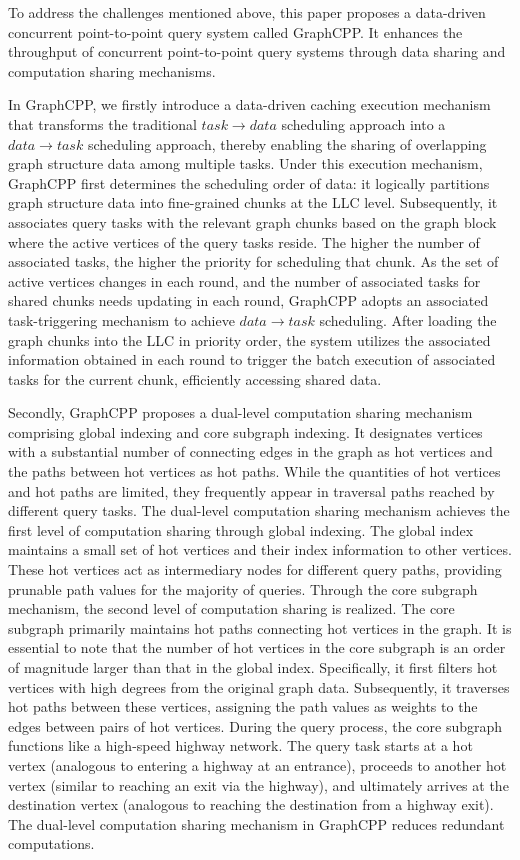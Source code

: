 \documentclass[lettersize,journal]{IEEEtran} %
\begin{document}
To address the challenges mentioned above, this paper proposes a data-driven concurrent point-to-point query system called GraphCPP. It enhances the throughput of concurrent point-to-point query systems through data sharing and computation sharing mechanisms.

In GraphCPP, we firstly introduce a data-driven caching execution mechanism that transforms the traditional $task→data$ scheduling approach into a $data→task$ scheduling approach, thereby enabling the sharing of overlapping graph structure data among multiple tasks. Under this execution mechanism, GraphCPP first determines the scheduling order of data: it logically partitions graph structure data into fine-grained chunks at the LLC level. Subsequently, it associates query tasks with the relevant graph chunks based on the graph block where the active vertices of the query tasks reside. The higher the number of associated tasks, the higher the priority for scheduling that chunk. As the set of active vertices changes in each round, and the number of associated tasks for shared chunks needs updating in each round, GraphCPP adopts an associated task-triggering mechanism to achieve $data→task$ scheduling. After loading the graph chunks into the LLC in priority order, the system utilizes the associated information obtained in each round to trigger the batch execution of associated tasks for the current chunk, efficiently accessing shared data.

Secondly, GraphCPP proposes a dual-level computation sharing mechanism comprising global indexing and core subgraph indexing. It designates vertices with a substantial number of connecting edges in the graph as hot vertices and the paths between hot vertices as hot paths. While the quantities of hot vertices and hot paths are limited, they frequently appear in traversal paths reached by different query tasks. The dual-level computation sharing mechanism achieves the first level of computation sharing through global indexing. The global index maintains a small set of hot vertices and their index information to other vertices. These hot vertices act as intermediary nodes for different query paths, providing prunable path values for the majority of queries. Through the core subgraph mechanism, the second level of computation sharing is realized. The core subgraph primarily maintains hot paths connecting hot vertices in the graph. It is essential to note that the number of hot vertices in the core subgraph is an order of magnitude larger than that in the global index. Specifically, it first filters hot vertices with high degrees from the original graph data. Subsequently, it traverses hot paths between these vertices, assigning the path values as weights to the edges between pairs of hot vertices. During the query process, the core subgraph functions like a high-speed highway network. The query task starts at a hot vertex (analogous to entering a highway at an entrance), proceeds to another hot vertex (similar to reaching an exit via the highway), and ultimately arrives at the destination vertex (analogous to reaching the destination from a highway exit). The dual-level computation sharing mechanism in GraphCPP reduces redundant computations.
\end{document}
